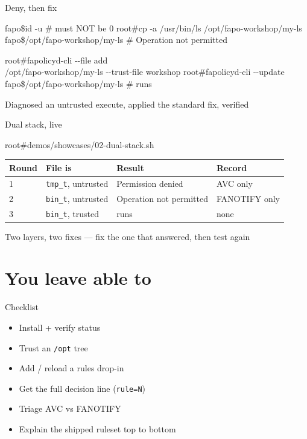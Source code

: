 \documentclass[aspectratio=169,11pt]{beamer}
\newcommand{\ok}[1]{\textcolor{allowc}{#1}}
\newcommand{\no}[1]{\textcolor{denyc}{#1}}
\newcommand{\rootp}{\textcolor{rootc}{root\#}}
\newcommand{\fapop}{\textcolor{fapoc}{fapo\$}}
\newcommand{\dd}{-{}-}
\begin{document}
\begin{frame}[fragile]{Deny, then fix}
  \begin{semiverbatim}
\fapop id -u                              # must NOT be 0
\rootp cp -a /usr/bin/ls /opt/fapo-workshop/my-ls
\fapop /opt/fapo-workshop/my-ls           # \no{Operation not permitted}

\rootp fapolicyd-cli \dd{}file add \\
        /opt/fapo-workshop/my-ls \dd{}trust-file workshop
\rootp fapolicyd-cli \dd{}update
\fapop /opt/fapo-workshop/my-ls           # \ok{runs}
  \end{semiverbatim}
  Diagnosed an untrusted execute, applied the standard fix, verified
\end{frame}

\begin{frame}[fragile]{Dual stack, live}
  \begin{semiverbatim}
\rootp demos/showcases/02-dual-stack.sh
  \end{semiverbatim}
  \begin{tabular}{@{}llll@{}}
    \toprule
    Round & File is & Result & Record \\
    \midrule
    1 & \texttt{tmp\_t}, untrusted & \no{Permission denied} & AVC only \\
    2 & \texttt{bin\_t}, untrusted & \no{Operation not permitted} & FANOTIFY only \\
    3 & \texttt{bin\_t}, trusted & \ok{runs} & none \\
    \bottomrule
  \end{tabular}

  \bigskip
  Two layers, two fixes --- fix the one that answered, then test again
\end{frame}

\section{You leave able to}

\begin{frame}{Checklist}
  \begin{itemize}
    \item[$\square$] Install + verify status
    \item[$\square$] Trust an \texttt{/opt} tree
    \item[$\square$] Add / reload a rules drop-in
    \item[$\square$] Get the full decision line (\texttt{rule=N})
    \item[$\square$] Triage AVC vs FANOTIFY
    \item[$\square$] Explain the shipped ruleset top to bottom
  \end{itemize}
\end{frame}
\end{document}

